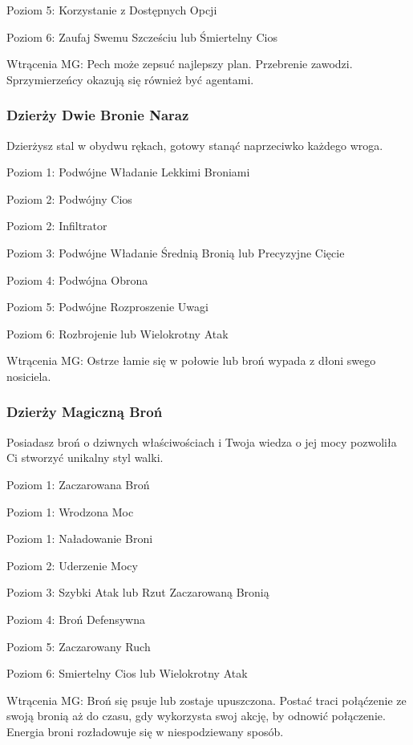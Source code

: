 Poziom 5: Korzystanie z Dostępnych Opcji

Poziom 6: Zaufaj Swemu Szcześciu lub Śmiertelny Cios

Wtrącenia MG: Pech może zepsuć najlepszy plan. Przebrenie zawodzi. Sprzymierzeńcy okazują się również być agentami.

\subsubsection{Dzierży Dwie Bronie Naraz}

Dzierżysz stal w obydwu rękach, gotowy stanąć naprzeciwko każdego wroga. 

Poziom 1: Podwójne Władanie Lekkimi Broniami 

Poziom 2: Podwójny Cios

Poziom 2: Infiltrator

Poziom 3: Podwójne Władanie Średnią Bronią lub Precyzyjne Cięcie

Poziom 4: Podwójna Obrona

Poziom 5: Podwójne Rozproszenie Uwagi

Poziom 6: Rozbrojenie lub Wielokrotny Atak

Wtrącenia MG: Ostrze łamie się w połowie lub broń wypada z dłoni swego nosiciela. 

\subsubsection{Dzierży Magiczną Broń}

Posiadasz broń o dziwnych właściwościach i Twoja wiedza o jej mocy pozwoliła Ci stworzyć unikalny styl walki.

Poziom 1: Zaczarowana Broń

Poziom 1: Wrodzona Moc

Poziom 1: Naładowanie Broni

Poziom 2: Uderzenie Mocy

Poziom 3: Szybki Atak lub Rzut Zaczarowaną Bronią

Poziom 4: Broń Defensywna

Poziom 5: Zaczarowany Ruch

Poziom 6: Smiertelny Cios lub Wielokrotny Atak

Wtrącenia MG: Broń się psuje lub zostaje upuszczona. Postać traci połąćzenie ze swoją bronią aż do czasu, gdy wykorzysta swoj akcję, by odnowić połączenie. Energia broni rozładowuje się w niespodziewany sposób. 

